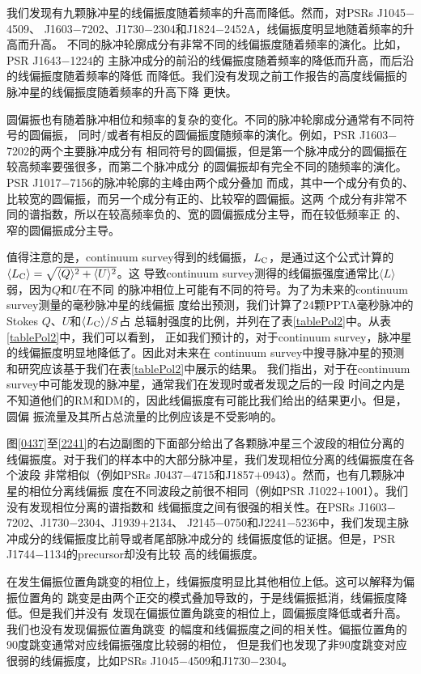 我们发现有九颗脉冲星的线偏振度随着频率的升高而降低。然而，对PSRs J1045$-$4509、
J1603$-$7202、J1730$-$2304和J1824$-$2452A，线偏振度明显地随着频率的升高而升高。
不同的脉冲轮廓成分有非常不同的线偏振度随着频率的演化。比如，PSR J1643$-$1224的
主脉冲成分的前沿的线偏振度随着频率的降低而升高，而后沿的线偏振度随着频率的降低
而降低。我们没有发现之前工作报告的高度线偏振的脉冲星的线偏振度随着频率的升高下降
更快\supercite{Kramer99}。

圆偏振也有随着脉冲相位和频率的复杂的变化。不同的脉冲轮廓成分通常有不同符号的圆偏振，
同时/或者有相反的圆偏振度随频率的演化。例如，PSR J1603$-$7202的两个主要脉冲成分有
相同符号的圆偏振，但是第一个脉冲成分的圆偏振在较高频率要强很多，而第二个脉冲成分
的圆偏振却有完全不同的随频率的演化。PSR J1017$-$7156的脉冲轮廓的主峰由两个成分叠加
而成，其中一个成分有负的、比较宽的圆偏振，而另一个成分有正的、比较窄的圆偏振。这两
个成分有非常不同的谱指数，所以在较高频率负的、宽的圆偏振成分主导，而在较低频率正
的、窄的圆偏振成分主导。

值得注意的是，continuum survey得到的线偏振，$L_{\rm{C}}$，是通过这个公式计算的
$\langle L_{\rm{C}}\rangle = \sqrt{\langle Q\rangle^{2}+\langle U\rangle^{2}}$。这
导致continuum survey测得的线偏振强度通常比$\langle L\rangle$弱，因为$Q$和$U$在不同
的脉冲相位上可能有不同的符号。为了为未来的continuum survey测量的毫秒脉冲星的线偏振
度给出预测，我们计算了24颗PPTA毫秒脉冲的Stokes $Q$、$U$和$\langle L_{\rm{C}} \rangle/S$占
总辐射强度的比例，并列在了表\ref{tablePol2}中。从表\ref{tablePol2}中，我们可以看到，
正如我们预计的，对于continuum survey，脉冲星的线偏振度明显地降低了。因此对未来在
continuum survey中搜寻脉冲星的预测和研究应该基于我们在表\ref{tablePol2}中展示的结果。
我们指出，对于在continuum survey中可能发现的脉冲星，通常我们在发现时或者发现之后的一段
时间之内是不知道他们的RM和DM的，因此线偏振度有可能比我们给出的结果更小。但是，圆偏
振流量及其所占总流量的比例应该是不受影响的。

图\ref{0437}至\ref{2241}的右边副图的下面部分给出了各颗脉冲星三个波段的相位分离的
线偏振度。对于我们的样本中的大部分脉冲星，我们发现相位分离的线偏振度在各个波段
非常相似（例如PSRs J0437$-$4715和J1857$+$0943）。然而，也有几颗脉冲星的相位分离线偏振
度在不同波段之前很不相同（例如PSR J1022$+$1001）。我们没有发现相位分离的谱指数和
线偏振度之间有很强的相关性。在PSRs J1603$-$7202、J1730$-$2304、J1939$+$2134、
J2145$-$0750和J2241$-$5236中，我们发现主脉冲成分的线偏振度比前导或者尾部脉冲成分的
线偏振度低的证据\supercite{Basu15}。但是，PSR J1744$-$1134的precursor却没有比较
高的线偏振度。

在发生偏振位置角跳变的相位上，线偏振度明显比其他相位上低。这可以解释为偏振位置角的
跳变是由两个正交的模式叠加导致的，于是线偏振抵消，线偏振度降低。但是我们并没有
发现在偏振位置角跳变的相位上，圆偏振度降低或者升高。我们也没有发现偏振位置角跳变
的幅度和线偏振度之间的相关性。偏振位置角的90度跳变通常对应线偏振强度比较弱的相位，
但是我们也发现了非90度跳变对应很弱的线偏振度，比如PSRs J1045$-$4509和J1730$-$2304。

